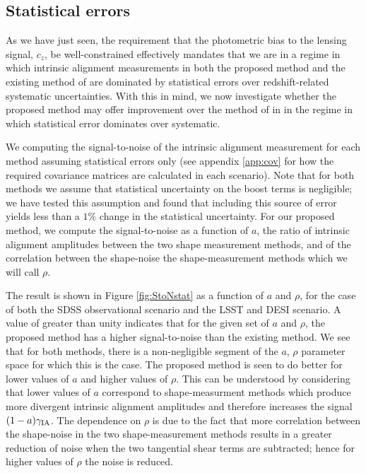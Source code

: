 \documentclass[a4paper,fleqn,usenatbib]{mnras}
\begin{document}
\subsection{Statistical errors}
\label{subsec:statresults}
\noindent
As we have just seen, the requirement that the photometric bias to the lensing signal, $c_z$, be well-constrained effectively mandates that we are in a regime in which intrinsic alignment measurements in both the proposed method and the existing method of \cite{Blazek2012} are dominated by statistical errors over redshift-related systematic uncertainties. With this in mind, we now investigate whether the proposed method may offer improvement over the method of \cite{Blazek2012} in in the regime in which statistical error dominates over systematic. 

We computing the signal-to-noise of the intrinsic alignment measurement for each method assuming statistical errors only (see appendix \ref{app:cov} for how the required covariance matrices are calculated in each scenario). Note that for both methods we assume that statistical uncertainty on the boost terms is negligible; we have tested this assumption and found that including this source of error yields less than a $1\%$ change in the statistical uncertainty. For our proposed method, we compute the signal-to-noise as a function of $a$, the ratio of intrinsic alignment amplitudes between the two shape measurement methods, and of the correlation between the shape-noise the shape-measurement methods which we will call $\rho$. 

The result is shown in Figure \ref{fig:StoNstat} as a function of $a$ and $\rho$, for the case of both the SDSS observational scenario and the LSST and DESI scenario. A value of greater than unity indicates that for the given set of $a$ and $\rho$, the proposed method has a higher signal-to-noise than the existing method. We see that for both methods, there is a non-negligible segment of the $a$, $\rho$ parameter space for which this is the case. The proposed method is seen to do better for lower values of $a$ and higher values of $\rho$. This can be understood by considering that lower values of $a$ correspond to shape-measurment methods which produce more divergent intrinsic alignment amplitudes and therefore increases the signal $(1-a)\gamma_{\rm IA}$. The dependence on $\rho$ is due to the fact that more correlation between the shape-noise in the two shape-measurement methods results in a greater reduction of noise when the two tangential shear terms are subtracted; hence for higher values of $\rho$ the noise is reduced. 
\end{document}
